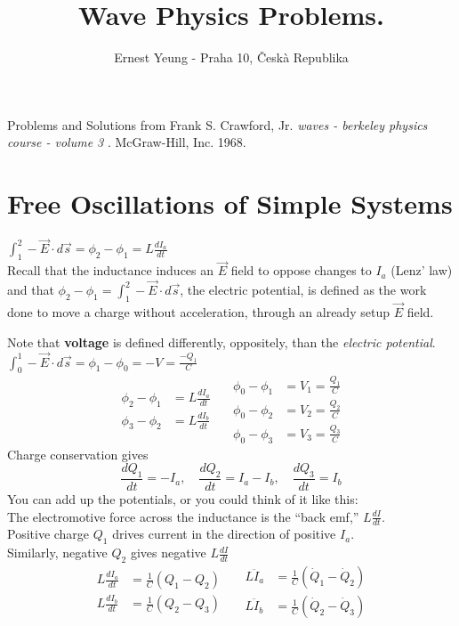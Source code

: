 \documentclass[twoside,10pt]{amsart}
\title{
  Wave Physics Problems.  
}
\author{
  Ernest Yeung - Praha 10, \v Cesk\`a Republika 
       }
\newcommand{\problemhead}[1]
  {\smallskip
   \noindent{\large\bf Problem #1.}
   \smallskip}
\begin{document}

\maketitle

Problems and Solutions from Frank S. Crawford, Jr. \emph{ waves - berkeley physics course - volume 3 }.  McGraw-Hill, Inc.  1968.  

\section{ Free Oscillations of Simple Systems }

\problemhead{1.1} $\int_1^2 - \vec{E} \cdot d\vec{s} = \phi_2 - \phi_1 = L\frac{d I_a}{dt}$ \\
Recall that the inductance induces an $\vec{E}$ field to oppose changes to $I_a$ (Lenz' law) and that $\phi_2 - \phi_1 = \int_1^2 - \vec{E} \cdot d\vec{s}$, the electric potential, is defined as the work done to move a charge without acceleration, through an already setup $\vec{E}$ field.  

Note that \textbf{voltage} is defined differently, oppositely, than the \emph{electric potential}.  \\
$\int_0^1 -\vec{E} \cdot d\vec{s} = \phi_1 - \phi_0 = -V = \frac{-Q_1}{C}$ \\
\[
\begin{aligned}
  \phi_2 - \phi_1 & = L \frac{d I_a}{dt} \\
  \phi_3 - \phi_2 & = L \frac{d I_b}{dt} 
\end{aligned}
\quad 
\begin{aligned}
  \phi_0-\phi_1 & = V_1 = \frac{Q_1}{C} \\
  \phi_0-\phi_2 & = V_2 = \frac{Q_2}{C} \\
  \phi_0-\phi_3 & = V_3 = \frac{Q_3}{C} 
\end{aligned}
\]
Charge conservation gives
\[
\frac{dQ_1}{dt} = -I_a, \quad \frac{dQ_2}{dt} = I_a-I_b, \quad \frac{dQ_3}{dt} = I_b
\]
You can add up the potentials, or you could think of it like this: \\
The electromotive force across the inductance is the ``back emf,'' $L\frac{dI}{dt}$.  \\
\quad Positive charge $Q_1$ drives current in the direction of positive $I_a$.  \\
\quad Similarly, negative $Q_2$ gives negative $L\frac{dI}{dt}$  
\[
\begin{aligned}
  L \frac{dI_a}{dt} & = \frac{1}{C} (Q_1 - Q_2) \\
  L \frac{dI_b}{dt} & = \frac{1}{C} (Q_2 - Q_3)
\end{aligned}
\quad \,
\begin{aligned}
  L\ddot{I}_a & = \frac{1}{C} ( \dot{Q}_1 - \dot{Q}_2) \\
  L\ddot{I}_b & = \frac{1}{C} ( \dot{Q}_2 - \dot{Q}_3 )
\end{aligned}
\]
\end{document}
